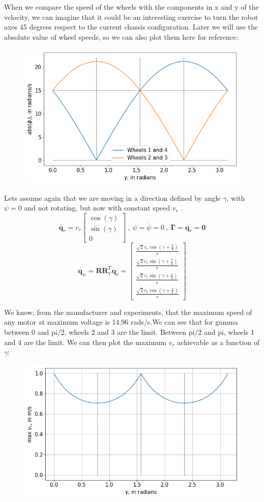 \documentclass[12pt]{article}
\renewcommand{\vec}[1]{\bm{#1}}
\newcommand{\R}{\mathbb R}
\def\Torque{\vec \Gamma}
\def\R{\vec R}
\def\q{\vec q}
\begin{document}
When we compare the speed of the wheels with the components in x and y of the velocity, we can imagine that it could be an interesting exercise to turn the robot axes 45 degrees respect to the current chassis configuration. Later we will use the absolute value of wheel speeds, so we can also plot them here for reference:
\begin{figure}[h]
	\centering
	\includegraphics[width=.5\linewidth]{abs_wheel_speeds}
	\label{fig:abs_wheel_speed}
\end{figure}

Lets assume again that we are moving in a direction defined by angle $\gamma$, with $\psi = 0$ and not rotating, but now with constant speed $v_r$ .
$$\dot{\q_r} = v_r\left[\begin{matrix}\operatorname{cos}\left(\gamma\right)\\\operatorname{sin}\left(\gamma\right)\\0\end{matrix}\right]\ ,\ \psi = \dot{\psi} = 0\ ,\ \Torque = \ddot{\q_r} = \vec{0}$$
$$ \dot{\q_w} = \R\R_{\psi}^T\dot{\q_r} = \left[\begin{matrix}\frac{\sqrt{2} v_{r} \operatorname{cos}\left(\gamma + \frac{\pi}{4}\right)}{r}\\\frac{\sqrt{2} v_{r} \operatorname{sin}\left(\gamma + \frac{\pi}{4}\right)}{r}\\\frac{\sqrt{2} v_{r} \operatorname{sin}\left(\gamma + \frac{\pi}{4}\right)}{r}\\\frac{\sqrt{2} v_{r} \operatorname{cos}\left(\gamma + \frac{\pi}{4}\right)}{r}\end{matrix}\right]$$

We know, from the manufacturer and experiments, that the maximum speed of any motor at maximum voltage is 14.96 rads/s.We can see that for gamma between 0 and pi/2, wheels 2 and 3 are the limit. Between pi/2 and pi, wheels 1 and 4 are the limit. We can then plot the maximum $v_r$ achievable as a function of $\gamma$:

\begin{figure}[h]
	\centering
	\includegraphics[width=.5\linewidth]{max_vr_gamma}
	\label{fig:max_vr_gamma}
\end{figure}
\end{document}
